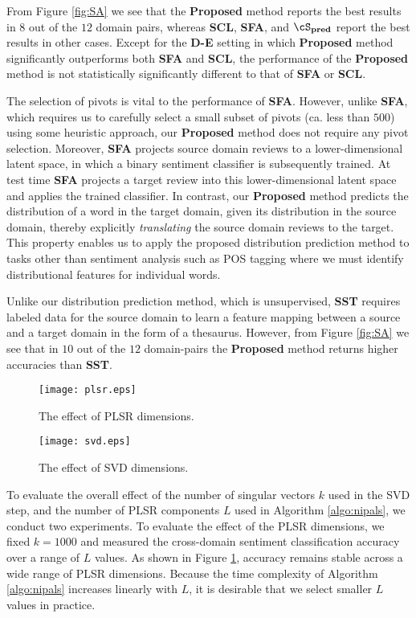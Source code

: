 \documentclass[11pt]{article}
\begin{document}
From Figure \ref{fig:SA} we see that the \textbf{Proposed} method reports the best results 
in $8$ out of the $12$ domain pairs, whereas \textbf{SCL}, \textbf{SFA}, and   $\mathbf{\cS_{pred}}$
report the best results in other cases. 
Except for the \textbf{D-E} setting in which \textbf{Proposed} method significantly outperforms
both \textbf{SFA} and \textbf{SCL}, the performance of the \textbf{Proposed} method 
is not statistically significantly different to that of \textbf{SFA} or \textbf{SCL}.


The selection of pivots is vital to the performance of \textbf{SFA}. 
However, unlike \textbf{SFA}, which requires us to carefully select a small subset of pivots (ca. less than $500$)
using some heuristic approach, our \textbf{Proposed} method does not require any pivot selection.
Moreover, \textbf{SFA} projects source domain reviews to a lower-dimensional latent space, 
in which a binary sentiment classifier is subsequently trained. At test time \textbf{SFA}  projects a target review
into this lower-dimensional latent space and applies the trained classifier.
In contrast, our \textbf{Proposed} method  predicts the distribution of a word in the target domain,
given its distribution in the source domain, thereby explicitly \textit{translating} the source domain reviews
to the target. This property enables us to apply the proposed distribution prediction method to tasks other than sentiment
analysis such as POS tagging where we must identify distributional features for individual words.


Unlike our distribution prediction method, which is unsupervised,
 \textbf{SST} requires labeled data for the source domain to learn a feature mapping
between a source and a target domain in the form of a thesaurus.
However, from Figure \ref{fig:SA} we see that in $10$ out of the $12$ domain-pairs the \textbf{Proposed}
method returns higher accuracies than \textbf{SST}.

\begin{figure}[t]
\centering
\texttt{[image: plsr.eps]}
\caption{The effect of PLSR dimensions.}
\label{fig:PLSR}
\end{figure}

\begin{figure}[t]
\centering
\texttt{[image: svd.eps]}
\caption{The effect of SVD dimensions.}
\label{fig:SVD}
\end{figure}

To evaluate the overall effect of the number of singular vectors $k$ used in the SVD step, and the number of 
PLSR components $L$ used in Algorithm \ref{algo:nipals}, we conduct two experiments.
To evaluate the effect of the PLSR dimensions, we fixed $k=1000$ and measured the cross-domain
sentiment classification accuracy over a range of $L$ values.
As shown in Figure \ref{fig:PLSR}, accuracy remains stable across a wide range of PLSR dimensions.
Because the time complexity of Algorithm \ref{algo:nipals} increases linearly with $L$, it is desirable that
we select smaller $L$ values in practice. 
\end{document}
